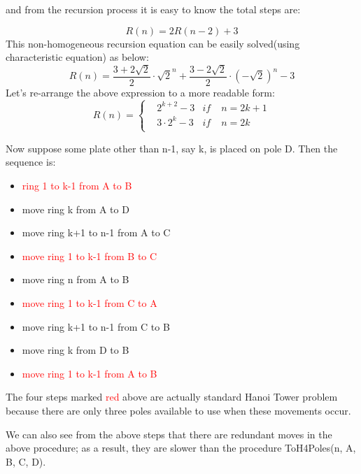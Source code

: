 \documentclass[a4paper,11pt]{article}
\theoremstyle{mytheor}
\begin{document}
and from the recursion process it is easy to know the total steps are:

$$
R(n) = 2R(n-2) + 3
$$
This non-homogeneous recursion equation can be easily solved(using characteristic equation) as below:
$$
R(n) = \frac{3+2\sqrt{2}}{2}\cdot \sqrt{2}^{n}+\frac{3-2\sqrt{2}}{2}\cdot (-\sqrt{2})^{n}-3
$$
Let's re-arrange the above expression to a more readable form:
$$R(n)=\left\{
\begin{aligned}
&2^{k+2}-3 & if\; &n=2k+1 \\
&3\cdot 2^{k} - 3  & if\; &  n =2k \\
\end{aligned}
\right.
$$


\vspace{1 ex}
\noindent Now suppose some plate other than n-1, say k, is placed on pole D. 
Then the sequence is:
\begin{itemize}
    \item \textcolor{red}{ring 1 to k-1 from A to B}
    \item move ring k from A to D
    \item move ring k+1 to n-1 from A to C
    \item \textcolor{red}{move ring 1 to k-1 from B to C}
    \item move ring n from A to B
    \item \textcolor{red}{move ring 1 to k-1 from C to A}
    \item move ring k+1 to n-1 from C to B
    \item move ring k from D to B
    \item \textcolor{red}{move ring 1 to k-1 from A to B}
\end{itemize}


The four steps marked \textcolor{red}{red} above are actually standard Hanoi Tower problem because there are only three poles available to use when these movements occur.
\iffalse
So we can write down the total steps of n rings as:
\begin{equation}
\begin{split}M(n) = &M(k-1) + 1 + 2^{n-k-2} - 1 + 1 + 2^{k-2} -1 + 1 + 2^{k-2}-1 + 2^{n-k-2} - 1 + 1 + M(k-1) \\
&=2M(k-1) + 2^{n-k-1} + 2^{k-1} -1
\end{split}
\end{equation}
\fi

We can also see from the above steps that there are redundant moves in the above procedure; as a result, they are slower than the procedure ToH4Poles(n, A, B, C, D).
\end{document}
